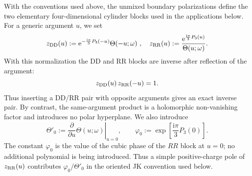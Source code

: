 \documentclass[11pt,a4paper]{article}
\numberwithin{equation}{section}
\theoremstyle{plain}
\theoremstyle{definition}
\theoremstyle{remark}
\newcommand{\ii}{\mathrm{i}}
\begin{document}
With the conventions used above, the unmixed boundary polarizations define the two elementary four-dimensional cylinder blocks used in the applications below.  For a generic argument $u$, we set
\begin{equation}
z_{\rm DD}(u)
:=
\text{e}^{-\frac{\ii\pi}{3}P_3(-u)}
\Theta(-u;\omega)~,\quad 
z_{\rm RR}(u)
:=
\frac{
\text{e}^{\frac{\ii\pi}{3}P_3(u)}
}{\Theta(u;\omega)}.
\label{eq:4d-cylinder-blocks}
\end{equation}
With this normalization the DD and RR blocks are inverse after reflection of the argument:
\begin{equation}
z_{\rm DD}(u)\,z_{\rm RR}(-u)=1.
\label{eq:zDDzRR-inverse}
\end{equation}
Thus inserting a DD/RR pair with opposite arguments gives an exact inverse pair.  By contrast, the same-argument product is a holomorphic non-vanishing factor and introduces no polar hyperplane.
We also introduce
\begin{equation}
\Theta'_0:=\left.\frac{\partial}{\partial u}\Theta(u;\omega)\right|_{u=0},
\qquad
\varphi_0:=
\exp\!\left[\frac{\ii\pi}{3}P_3(0)\right].
\label{eq:theta-prime-varphi0}
\end{equation}
The constant $\varphi_0$ is the value of the cubic phase of the $RR$ block at $u=0$; no additional polynomial is being introduced.  Thus a simple positive-charge pole of $z_{\rm RR}(u)$ contributes $\varphi_0/\Theta'_0$ in the oriented JK convention used below.
\end{document}
